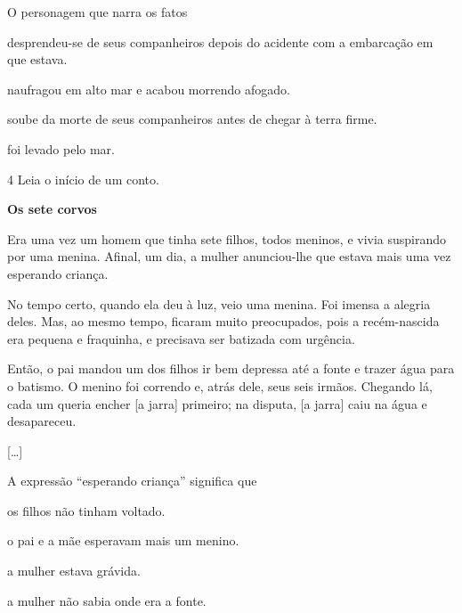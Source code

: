 O personagem que narra os fatos

\begin{escolha}
\item desprendeu-se de seus companheiros depois do acidente com a embarcação em que estava.

\item naufragou em alto mar e acabou morrendo afogado.

\item soube da morte de seus companheiros antes de chegar à terra firme.

\item foi levado pelo mar.
\end{escolha}


\num{4} Leia o início de um conto.

\begin{myquote}
\textbf{Os sete corvos}

Era uma vez um homem que tinha sete filhos, todos meninos, e vivia
suspirando por uma menina. Afinal, um dia, a mulher anunciou-lhe que
estava mais uma vez esperando criança.

No tempo certo, quando ela deu à luz, veio uma menina. Foi imensa a
alegria deles. Mas, ao mesmo tempo, ficaram muito preocupados, pois a
recém-nascida era pequena e fraquinha, e precisava ser batizada com
urgência.

Então, o pai mandou um dos filhos ir bem depressa até a fonte e trazer
água para o batismo. O menino foi correndo e, atrás dele, seus seis
irmãos. Chegando lá, cada um queria encher [a jarra] primeiro; na
disputa, [a jarra] caiu na água e desapareceu.

{[}\ldots{}{]}

\end{myquote}

A expressão ``esperando criança'' significa que

\begin{escolha}
\item os filhos não tinham voltado.

\item o pai e a mãe esperavam mais um menino.

\item a mulher estava grávida.

\item a mulher não sabia onde era a fonte.
\end{escolha}

